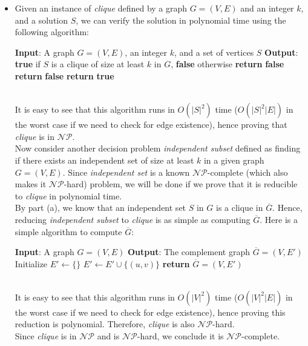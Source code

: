 \documentclass{article}
\begin{document}
\begin{itemize}
    \item[(b)] Given an instance of \textit{clique} defined by a graph $G = (V, E)$ and an integer $k$, and a solution $S$, we can verify the solution in polynomial time using the following algorithm:
    \begin{algorithm}[h!]
      \caption{Verify solution $S$ for \textit{clique} decision problem}
      \begin{algorithmic}[1]
        \State \textbf{Input}: A graph $G = (V, E)$, an integer $k$, and a set of vertices $S$
        \State \textbf{Output}: \textbf{true} if $S$ is a clique of size at least $k$ in $G$, \textbf{false} otherwise
          \State \textbf{return} \textbf{false}
        \EndIf
            \State \textbf{return} \textbf{false}
          \EndIf
        \EndFor
        \State \textbf{return} \textbf{true}
      \end{algorithmic}
    \end{algorithm} \\
    It is easy to see that this algorithm runs in $O(|S|^2)$ time ($O(|S|^2|E|)$ in the worst case if we need to check for edge existence), hence proving that \textit{clique} is in $\mathcal{NP}$. \\
    Now consider another decision problem \textit{independent subset} defined as finding if there exists an independent set of size at least $k$ in a given graph $G = (V, E)$.
    Since \textit{independent set} is a known $\mathcal{NP}$-complete (which also makes it $\mathcal{NP}$-hard) problem, we will be done if we prove that it is reducible to \textit{clique} in polynomial time. \\
    By part (a), we know that an independent set $S$ in $G$ is a clique in $\overline{G}$.
    Hence, reducing \textit{independent subset} to \textit{clique} is as simple as computing $\overline{G}$.
    Here is a simple algorithm to compute $\overline{G}$:
    \begin{algorithm}[h!]
      \caption{Compute the complement $\overline{G}$ of a graph $G = (V, E)$}
      \begin{algorithmic}[1]
        \State \textbf{Input}: A graph $G = (V, E)$
        \State \textbf{Output}: The complement graph $\overline{G} = (V, E')$
        \State Initialize $E' \gets \{\}$
            \State $E' \gets E' \cup \{(u, v)\}$
          \EndIf
        \EndFor
        \State \textbf{return} $\overline{G} = (V, E')$
      \end{algorithmic}
    \end{algorithm} \\
    It is easy to see that this algorithm runs in $O(|V|^2)$ time ($O(|V|^2|E|)$ in the worst case if we need to check for edge existence), hence proving this reduction is polynomial.
    Therefore, \textit{clique} is also $\mathcal{NP}$-hard. \\
    Since \textit{clique} is in $\mathcal{NP}$ and is $\mathcal{NP}$-hard, we conclude it is $\mathcal{NP}$-complete.
  \end{itemize}
\end{document}
